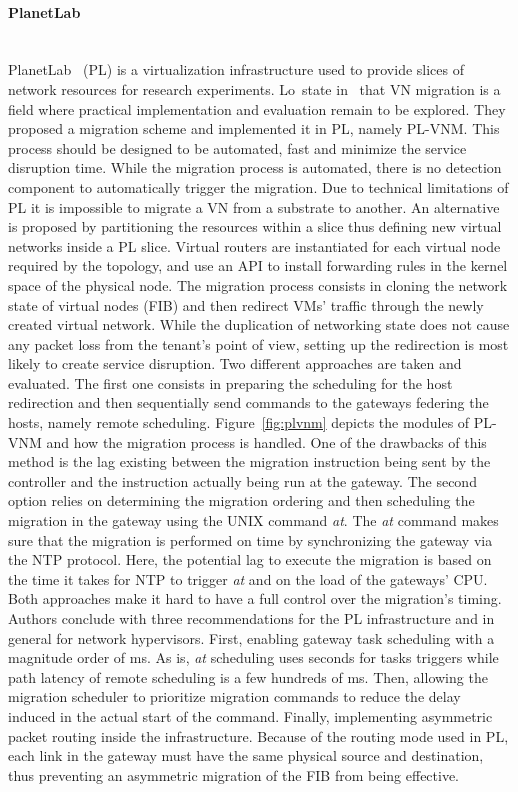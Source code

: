\paragraph{PlanetLab}\textbf{\\} 
PlanetLab~\cite{planetlab} (PL) is a virtualization infrastructure used to provide slices of network resources for research experiments. Lo~\etal state in~\cite{Lo2014} that VN migration is a field where practical implementation and evaluation remain to be explored. They proposed a migration scheme and implemented it in PL, namely PL-VNM. This process should be designed to be automated, fast and minimize the service disruption time. While the migration process is automated, there is no detection component to automatically trigger the migration. Due to technical limitations of PL it is impossible to migrate a VN from a substrate to another. An alternative is proposed by partitioning the resources within a slice thus defining new virtual networks inside a PL slice. Virtual routers are instantiated for each virtual node required by the topology, and use an API to install forwarding rules in the kernel space of the physical node. 
The migration process consists in cloning the network state of virtual nodes (\ie FIB) and then  redirect VMs' traffic through the newly created virtual network.
While the duplication of networking state does not cause any packet loss from the tenant's point of view, setting up the redirection is most likely to create service disruption.
Two different approaches are taken and evaluated. The first one consists in preparing the scheduling for the host redirection and then sequentially send commands to the gateways federing the hosts, namely remote scheduling.
Figure~\ref{fig:plvnm} depicts the modules of PL-VNM and how the migration process is handled.
One of the drawbacks of this method is the lag existing between the migration instruction being sent by the controller and the instruction actually being run at the gateway.
The second option relies on determining the migration ordering and then scheduling the migration in the gateway using the UNIX command \textit{at}. The \textit{at} command makes sure that the migration is performed on time by synchronizing the gateway via the NTP protocol. Here, the potential lag to execute the migration is based on the time it takes for NTP to trigger \textit{at} and on the load of the gateways' CPU.
Both approaches make it hard to have a full control over the migration's timing.
Authors conclude with three recommendations for the PL infrastructure and in general for network hypervisors.
First, enabling gateway task scheduling with a magnitude order of ms. As is, \textit{at} scheduling uses seconds for tasks triggers while path latency of remote scheduling is a few hundreds of ms.
Then, allowing the migration scheduler to prioritize migration commands to reduce the delay induced in the actual start of the command.
Finally, implementing asymmetric packet routing inside the infrastructure.
Because of the routing mode used in PL, each link in the gateway must have the same physical source and destination, thus preventing an asymmetric migration of the FIB from being effective. 

